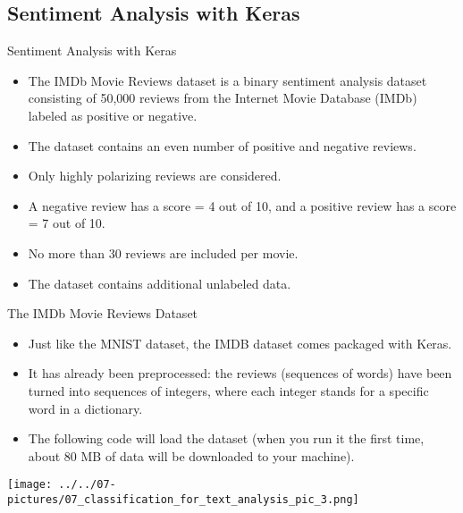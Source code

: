 \documentclass[11pt]{beamer}
\begin{document}
\subsection{Sentiment Analysis with Keras \\ }
\begin{frame}{Sentiment Analysis with Keras}
	\begin{itemize}
		\item The IMDb Movie Reviews dataset is a binary sentiment analysis dataset consisting of 50,000 reviews from the Internet Movie Database (IMDb) labeled as positive or negative. 
		\item The dataset contains an even number of positive and negative reviews. 
		\item Only highly polarizing reviews are considered. 
		\item A negative review has a score = 4 out of 10, and a positive review has a score = 7 out of 10. 
		\item No more than 30 reviews are included per movie. 
		\item The dataset contains additional unlabeled data.
	\end{itemize}
\end{frame}
\begin{frame}{The IMDb Movie Reviews Dataset}
	\begin{itemize}
		\item Just like the MNIST dataset, the IMDB dataset comes packaged with Keras. 
		\item It has already been preprocessed: the reviews (sequences of words) have been turned into sequences of integers, where each integer stands for a specific word in a dictionary.
		\item The following code will load the dataset (when you run it the first time, about 80 MB of data will be downloaded to your machine).
	\end{itemize}
	\begin{center}
	\texttt{[image: ../../07-pictures/07\_classification\_for\_text\_analysis\_pic\_3.png]}
	\end{center}
\end{frame}
\end{document}
